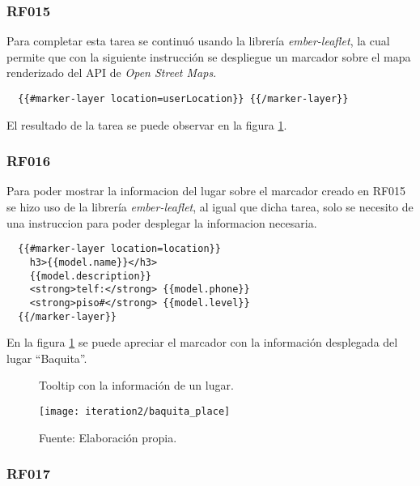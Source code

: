 \subsubsection{RF015}
\label{subs:RF015}

Para completar esta tarea se continuó usando la librería \emph{ember-leaflet}, la cual permite que con la siguiente instrucción se despliegue un marcador sobre el mapa renderizado del API de \emph{Open Street Maps}.

\begin{verbatim}
  {{#marker-layer location=userLocation}} {{/marker-layer}}
\end{verbatim}

El resultado de la tarea se puede observar en la figura \ref{fig:baquita_place}.

\subsubsection{RF016}
\label{subs:RF016}

Para poder mostrar la informacion del lugar sobre el marcador creado en RF015 se hizo uso de la librería \emph{ember-leaflet}, al igual que dicha tarea, solo se necesito de una instruccion para poder desplegar la informacion necesaria.

\begin{verbatim}
  {{#marker-layer location=location}}
    h3>{{model.name}}</h3>
    {{model.description}}
    <strong>telf:</strong> {{model.phone}}
    <strong>piso#</strong> {{model.level}}
  {{/marker-layer}}
\end{verbatim}

En la figura \ref{fig:baquita_place} se puede apreciar el marcador con la información desplegada del lugar ``Baquita''.

\begin{figure}[H]
  \begin{center}
    \caption{Tooltip con la información de un lugar.}
    \label{fig:baquita_place}
    \texttt{[image: iteration2/baquita\_place]}
    \caption*{Fuente: Elaboración propia.}
  \end{center}
\end{figure}


\subsubsection{RF017}
\label{subs:RF017}

